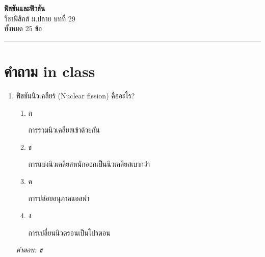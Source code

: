 \documentclass[12pt]{article}
\begin{document}
\begin{center}
{\Large\textbf{ฟิชชันและฟิวชัน}}\\[6pt]
{\normalsize วิชาฟิสิกส์ ม.ปลาย บทที่ 29}\\[4pt]
{\footnotesize ทั้งหมด 25 ข้อ}
\end{center}
\hrule
\bigskip

\section*{คำถาม in class}
\begin{enumerate}[label=\arabic*., itemsep=0.5\baselineskip, topsep=0.5\baselineskip, leftmargin=*]
\item ฟิชชันนิวเคลียร์ (Nuclear fission) คืออะไร?
\begin{enumerate}[label=\alph*)., itemsep=0.3\baselineskip, topsep=0.3\baselineskip]
\item ก\ 
\begin{minipage}[t]{0.9\linewidth}
\raggedright การรวมนิวเคลียสเข้าด้วยกัน
\end{minipage}
\item ข\ 
\begin{minipage}[t]{0.9\linewidth}
\raggedright การแบ่งนิวเคลียสหนักออกเป็นนิวเคลียสเบากว่า
\end{minipage}
\item ค\ 
\begin{minipage}[t]{0.9\linewidth}
\raggedright การปล่อยอนุภาคแอลฟา
\end{minipage}
\item ง\ 
\begin{minipage}[t]{0.9\linewidth}
\raggedright การเปลี่ยนนิวตรอนเป็นโปรตอน
\end{minipage}
\end{enumerate}
\vspace{-0.3\baselineskip}
\begin{small}
\textit{คำตอบ: ข}
\end{small}


\end{enumerate}
\end{document}
